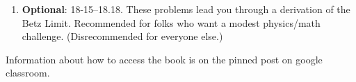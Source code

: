 \documentclass[12pt]{article}
\begin{document}

\begin{enumerate}
\setlength{\itemsep}{-1mm}
\item {\bf Optional}: 18-15--18.18. These problems lead you through a
  derivation of the Betz Limit. Recommended for folks who want a
  modest physics/math challenge. (Disrecommended for everyone
  else.)

    \end{enumerate}



\noindent Information about how to access the book is on the
pinned post on google classroom. 
\end{document}
